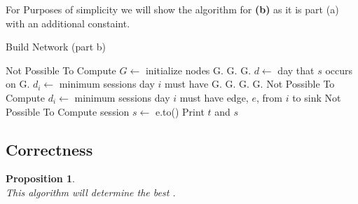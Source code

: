 \documentclass[12pt]{article}
\newtheorem{proposition}[theorem]{Proposition}
\begin{document}
\noindent For Purposes of simplicity we will show the algorithm for \textbf{(b)} as it is part (a) with an additional constaint.
\begin{algorithm}[H]
\caption{Build Network (part b)}
\begin{algorithmic}
    \EndProcedure
            Not Possible To Compute
        \EndIf
        \State $G \gets$ initialize nodes
            \State G.
            \State G.
                \State G.
            \EndFor
        \EndFor
        \State {}
            \State $d \gets$ day that $s$ occurs on
            \State G.
        \EndFor
            \State $d_i \gets$ minimum sessions day $i$ must have
            \State G.
            \State G.
        \EndFor
        \State G.
        \State G.
                Not Possible To Compute
            \EndIf
        \EndFor
            \State $d_i \gets$ minimum sessions day $i$ must have
            \State edge, $e$, from $i$ to sink
                Not Possible To Compute
            \EndIf
        \EndFor
                    \State session $s \gets$ e.to()
                    \State Print $t$ and $s$
                \EndIf
            \EndFor
        \EndFor
    \EndProcedure
\end{algorithmic}
\end{algorithm}


\newpage
\subsection{Correctness}
\begin{proposition}
~ \\ \indent This algorithm will determine the best .
\end{proposition}
\end{document}

